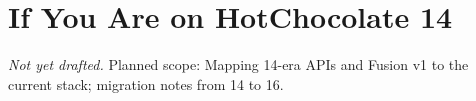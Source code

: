 \chapter{If You Are on HotChocolate 14}
\label{app:hc14}

\emph{Not yet drafted.} Planned scope: Mapping 14-era APIs and Fusion v1 to the current stack; migration notes from 14 to 16.
